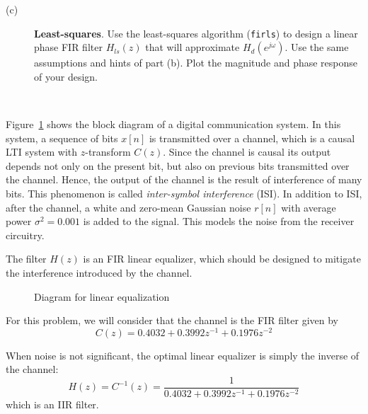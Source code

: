 \documentclass[12pt]{report}
\begin{document}
\begin{description}
	\item[(c)] \textbf{Least-squares}. Use the least-squares algorithm (\texttt{firls}) to design a linear phase FIR filter $H_{ls}(z)$ that will approximate $H_{d}(e^{j\omega})$. Use the same assumptions and hints of part (b). Plot the magnitude and phase response of your design.
	
\end{description}

\mbox{}\\

Figure~\ref{fig:linear_eq} shows the block diagram of a digital communication system. In this system, a sequence of bits $x[n]$ is transmitted over a channel, which is a causal LTI system with $z$-transform $C(z)$. Since the channel is causal its output depends not only on the present bit, but also on previous bits transmitted over the channel. Hence, the output of the channel is the result of interference of many bits. This phenomenon is called \textit{inter-symbol interference} (ISI). In addition to ISI, after the channel, a white and zero-mean Gaussian noise $r[n]$ with average power $\sigma^2 = 0.001$ is added to the signal. This models the noise from the receiver circuitry.

The filter $H(z)$ is an FIR linear equalizer, which should be designed to mitigate the interference introduced by the channel. 

\begin{figure}[h!]
	\centering
	\resizebox{0.7\textwidth}{!}{}
	\caption{Diagram for linear equalization}
	\label{fig:linear_eq}
\end{figure}

For this problem, we will consider that the channel is the FIR filter given by
\begin{equation}
	C(z) = 0.4032 + 0.3992z^{-1}  + 0.1976z^{-2}
\end{equation}

When noise is not significant, the optimal linear equalizer is simply the inverse of the channel:
\begin{equation} \label{eq:zero-forcing}
	H(z) = C^{-1}(z) = \frac{1}{0.4032 + 0.3992z^{-1}  + 0.1976z^{-2}}
\end{equation}
which is an IIR filter. 
\end{document}
